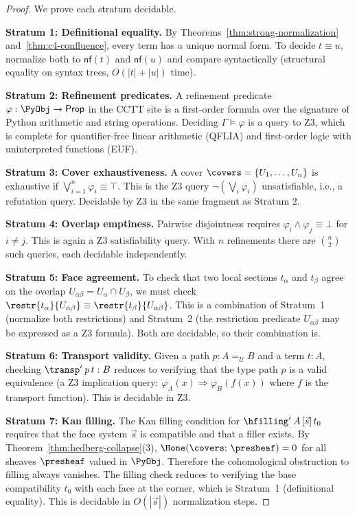 \begin{proof}
We prove each stratum decidable.

\textbf{Stratum 1: Definitional equality.}
By Theorems~\ref{thm:strong-normalization} and~\ref{thm:c4-confluence},
every term has a unique normal form.  To decide $t \equiv u$, normalize
both to $\mathsf{nf}(t)$ and $\mathsf{nf}(u)$ and compare syntactically
(structural equality on syntax trees, $O(|t| + |u|)$ time).

\textbf{Stratum 2: Refinement predicates.}
A refinement predicate $\varphi : \PyObj \to \mathsf{Prop}$ in the
CCTT site is a first-order formula over the signature of Python arithmetic
and string operations.  Deciding $\Gamma \models \varphi$ is a query to
Z3, which is complete for quantifier-free linear arithmetic (QFLIA) and
first-order logic with uninterpreted functions (EUF).

\textbf{Stratum 3: Cover exhaustiveness.}
A cover $\covers = \{U_1, \ldots, U_n\}$ is exhaustive if
$\bigvee_{i=1}^n \varphi_i \equiv \top$.  This is the Z3 query
$\neg(\bigvee_i \varphi_i)$ unsatisfiable, i.e., a refutation query.
Decidable by Z3 in the same fragment as Stratum 2.

\textbf{Stratum 4: Overlap emptiness.}
Pairwise disjointness requires $\varphi_i \wedge \varphi_j \equiv \bot$
for $i \neq j$.  This is again a Z3 satisfiability query.
With $n$ refinements there are $\binom{n}{2}$ such queries,
each decidable independently.

\textbf{Stratum 5: Face agreement.}
To check that two local sections $t_\alpha$ and $t_\beta$ agree on the
overlap $U_{\alpha\beta} = U_\alpha \cap U_\beta$, we must check
$\restr{t_\alpha}{U_{\alpha\beta}} \equiv \restr{t_\beta}{U_{\alpha\beta}}$.
This is a combination of Stratum~1 (normalize both restrictions) and
Stratum~2 (the restriction predicate $U_{\alpha\beta}$ may be expressed
as a Z3 formula).  Both are decidable, so their combination is.

\textbf{Stratum 6: Transport validity.}
Given a path $p : A =_\mathcal{U} B$ and a term $t : A$, checking
$\transp^i\,p\,t : B$ reduces to verifying that the type path $p$
is a valid equivalence (a Z3 implication query: $\varphi_A(x)
\Rightarrow \varphi_B(f(x))$ where $f$ is the transport function).
This is decidable in Z3.

\textbf{Stratum 7: Kan filling.}
The Kan filling condition for $\hfilling^i\,A\,[\vec{s}]\,t_0$ requires
that the face system $\vec{s}$ is compatible and that a filler exists.
By Theorem~\ref{thm:hedberg-collapse}(3), $\Hone(\covers;\,\presheaf) = 0$
for all sheaves $\presheaf$ valued in $\PyObj$.  Therefore the
cohomological obstruction to filling always vanishes.  The filling
check reduces to verifying the base compatibility $t_0$ with each
face at the corner, which is Stratum~1 (definitional equality).
This is decidable in $O(|\vec{s}|)$ normalization steps.


\end{proof}
